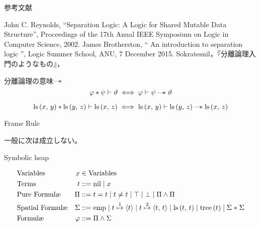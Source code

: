 \documentclass[notheorems, aspectratio=169, 12pt, unicode]{beamer}
\begin{document}
\begin{frame}{参考文献}
 \begin{thebibliography}{9}
   John C. Reynolds, ``Separation Logic: A Logic for Shared Mutable Data Structure'', Proceedings of the 17th Anual IEEE Symposium on Logic in Computer Science, 2002.
   James Brotherston, 
	  `` An introduction to separation logic '', 
	  Logic Summer School, ANU, 7 December 2015.
 Sokratesnil，『分離論理入門のようなもの』，\url{}
 \end{thebibliography} 
\end{frame}

\appendix

 \begin{frame}{分離論理の意味}{$\mathmagicwand$}
  \[
  \varphi * \psi \vdash \vartheta \iff \varphi \vdash \psi \mathmagicwand \vartheta
  \]
  
 \begin{ex}
  \[
  \mathprls{x}{y} * \mathprls{y}{z} \vdash \mathprls{x}{z} \iff \mathprls{x}{y} \vdash \mathprls{y}{z} \mathmagicwand \mathprls{x}{z}
  \]
 \end{ex}
 \end{frame}
 
 \begin{frame}{Frame Rule}
  \begin{definition}
   \begin{prooftree}
   \end{prooftree}
  \end{definition}
  \begin{rem}
   一般に次は成立しない。
   \begin{prooftree}
   \end{prooftree}
  \end{rem}
 \end{frame}

 \begin{frame}{Symbolic heap}
  \begin{definition}
  \minusbaselineskip
  \begin{align*}
   &\text{Variables}  &x &\in \mathVar \\
   &\text{Terms}  &t &::= \mathvalnil \mathrelbar x \\
   &\text{Pure Formul\ae}  &\Pi &::=   t = t  \mathrelbar t \neq t \mathrelbar \top \mathrelbar \bot \mathrelbar \Pi \land \Pi \\
   &\text{Spatial Formul\ae}  &\Sigma &::= \mathemp \mathrelbar \mathpointer{t}{1}{t} \mathrelbar  \mathpointer{t}{2}{t{,}\ t} \mathrelbar  \mathprls{t}{t} \mathrelbar \mathprtree{t} \mathrelbar \Sigma \mathsepstar \Sigma \\
   &\text{Formul\ae}  &\varphi &::=  \Pi \land \Sigma
  \end{align*}
 \end{definition}
 \end{frame}
\end{document}
